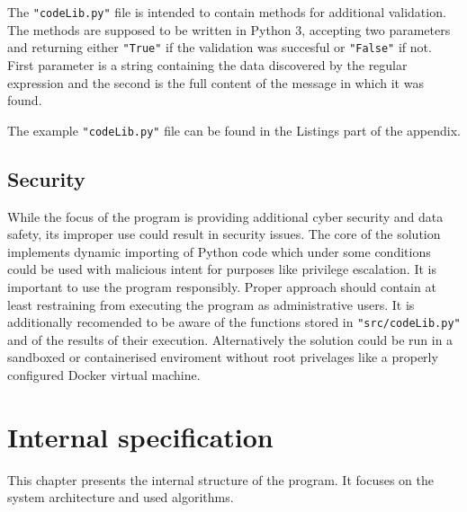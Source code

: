 \documentclass[a4paper,twoside,12pt]{book}
\begin{document}
The \lstinline|"codeLib.py"| file is intended to contain methods for additional validation. The methods are supposed
to be written in Python 3, accepting two parameters and returning either \lstinline|"True"| if the validation was succesful
or \lstinline|"False"| if not. First parameter is a string containing the data discovered by the regular expression and
the second is the full content of the message in which it was found.

The example \lstinline|"codeLib.py"| file can be found in the Listings part of the appendix.

\section{Security}

While the focus of the program is providing additional cyber security and data safety, its 
improper use could result in security issues. The core of the solution implements
dynamic importing of Python code which under some conditions could be used with malicious
intent for purposes like privilege escalation. It is important to use the program 
responsibly. Proper approach should contain at least restraining from executing
the program as administrative users. It is additionally recomended to be aware of the 
functions stored in \lstinline|"src/codeLib.py"| and of the results of their execution. Alternatively the solution could be run in a sandboxed or containerised
enviroment without root privelages like a properly configured Docker virtual machine.

\chapter{Internal specification}

This chapter presents the internal structure of the program. It focuses on the system architecture and used algorithms.
\end{document}
